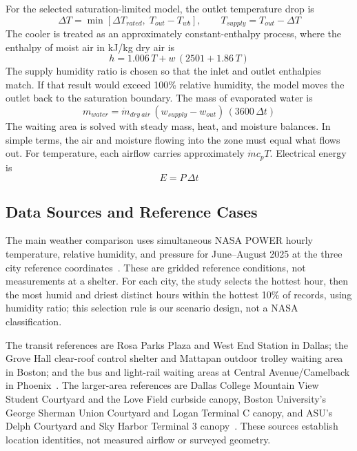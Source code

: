 For the selected saturation-limited model, the outlet temperature drop is
\begin{equation}
\Delta T = \min\left[\Delta T_{rated},\; T_{out} - T_{wb}\right], \qquad T_{supply} = T_{out} - \Delta T
\end{equation}
The cooler is treated as an approximately constant-enthalpy process, where the enthalpy of moist air in kJ/kg dry air is\cite{psychrolib_volume}
\begin{equation}
h = 1.006\,T + w\,(2501 + 1.86\,T)
\end{equation}
The supply humidity ratio is chosen so that the inlet and outlet enthalpies match. If that result would exceed 100\% relative humidity, the model moves the outlet back to the saturation boundary. The mass of evaporated water is
\begin{equation}
m_{water} = \dot{m}_{dry\ air}\,(w_{supply} - w_{out})\,(3600\,\Delta t)
\end{equation}
The waiting area is solved with steady mass, heat, and moisture balances. In simple terms, the air and moisture flowing into the zone must equal what flows out. For temperature, each airflow carries approximately $\dot{m}c_pT$. Electrical energy is
\begin{equation}
E = P\,\Delta t
\end{equation}
 

\subsection{Data Sources and Reference Cases}
The main weather comparison uses simultaneous NASA POWER hourly temperature, relative humidity, and pressure for June--August 2025 at the three city reference coordinates~\cite{nasa_hourly_summer_2025}. These are gridded reference conditions, not measurements at a shelter. For each city, the study selects the hottest hour, then the most humid and driest distinct hours within the hottest 10\% of records, using humidity ratio; this selection rule is our scenario design, not a NASA classification.

The transit references are Rosa Parks Plaza and West End Station in Dallas; the Grove Hall clear-roof control shelter and Mattapan outdoor trolley waiting area in Boston; and the bus and light-rail waiting areas at Central Avenue/Camelback in Phoenix~\cite{dart_rosa,dart_west,boston_shade,bwa_mattapan,valley_bus,valley_rail}. The larger-area references are Dallas College Mountain View Student Courtyard and the Love Field curbside canopy, Boston University's George Sherman Union Courtyard and Logan Terminal C canopy, and ASU's Delph Courtyard and Sky Harbor Terminal 3 canopy~\cite{dallas_college_student_courtyard,dal_lovefield_canopy,bu_gsu_courtyard,bos_logan_canopy,asu_delph_courtyard,phx_skyharbor_canopy}. These sources establish location identities, not measured airflow or surveyed geometry.

